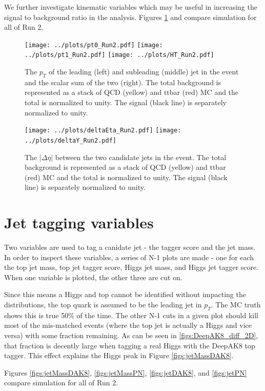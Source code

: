 \documentclass[10pt]{article}
\begin{document}
We further investigate kinematic variables which may be useful in increasing
the signal to background ratio in the analysis. Figures \ref{figs:pt} and 
\label{figs:etaY} compare simulation for all of Run 2.

\begin{figure}
    \texttt{[image: ../plots/pt0\_Run2.pdf]}
    \texttt{[image: ../plots/pt1\_Run2.pdf]}
    \texttt{[image: ../plots/HT\_Run2.pdf]}
    \label{figs:pt}
    \caption{The $p_T$ of the leading (left) and subleading (middle) jet in the event and the scalar sum of the two (right).
    The total background is represented as a stack of QCD (yellow) and ttbar (red) MC and the total is normalized to
    unity. The signal (black line) is separately normalized to unity.}
\end{figure}

\begin{figure}
    \texttt{[image: ../plots/deltaEta\_Run2.pdf]}
    \texttt{[image: ../plots/deltaY\_Run2.pdf]}
    \label{figs:etaY}
    \caption{The $|\Delta \eta|$ between the two candidate jets in the event. The total background
    is represented as a stack of QCD (yellow) and ttbar (red) MC and the total is normalized to
    unity. The signal (black line) is separately normalized to unity.}
\end{figure}


\section{Jet tagging variables}

Two variables are used to tag a canidate jet - the tagger score and the jet mass.
In order to inspect these variables, a series of N-1 plots are made - one for each
the top jet mass, top jet tagger score, Higgs jet mass, and Higgs jet tagger score.
When one variable is plotted, the other three are cut on.

Since this means a Higgs and top cannot be identified without impacting the distributions,
the top quark is assumed to be the leading jet in $p_T$. The MC truth shows this is true 50\%
of the time. The other N-1 cuts in a given plot should kill most
of the mis-matched events (where the top jet is actually a Higgs and vice versa)
with some fraction remaining. As can be seen in \ref{figs:DeepAK8_diff_2D}, that 
fraction is decently large when tagging a
real Higgs with the DeepAK8 top tagger. This effect explains the Higgs peak
in Figure \ref{figs:jetMassDAK8}.

Figures \ref{figs:jetMassDAK8}, \ref{figs:jetMassPN}, \ref{figs:jetDAK8}, and \ref{figs:jetPN}
compare simulation for all of Run 2.
\end{document}
